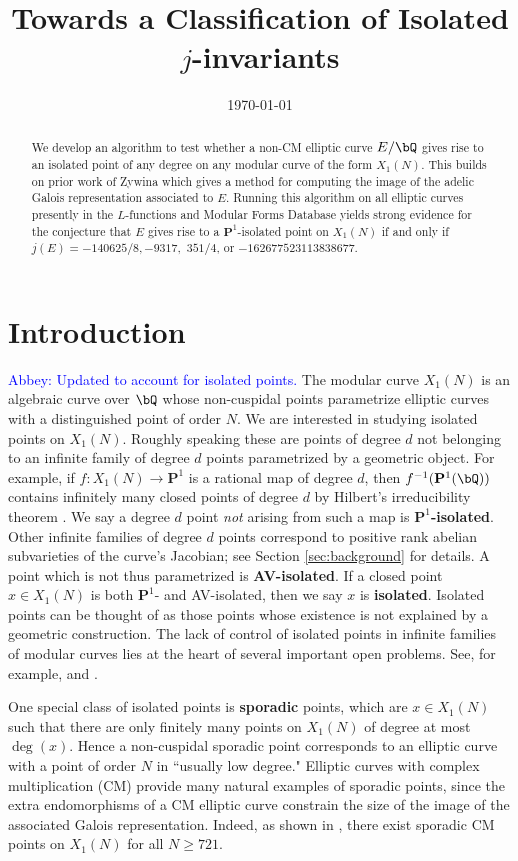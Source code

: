 \documentclass[11pt,reqno]{amsart}
\title{Towards a Classification of Isolated $j$-invariants}
\date{\today}
\theoremstyle{plain}
\theoremstyle{definition}
\newcommand{\Q}{\bQ}
\newcommand{\PP}{\mathbf P}
\newcommand{\abbey}[1]{\textcolor{blue}{Abbey: #1}}
\begin{document}
\begin{abstract} 
We develop an algorithm to test whether a non-CM elliptic curve $E/\Q$ gives rise to an isolated point of any degree on any modular curve of the form $X_1(N)$. This builds on prior work of Zywina which gives a method for computing the image of the adelic Galois representation associated to $E$. Running this algorithm on all elliptic curves presently in the $L$-functions and Modular Forms Database yields strong evidence for the conjecture that $E$ gives rise to a $\PP^1$-isolated point on $X_1(N)$ if and only if $j(E)=-140625/8, -9317,$ $351/4$, or $-162677523113838677$.
    \end{abstract}
\maketitle

\section{Introduction}
\label{sec:intro}
\abbey{Updated to account for isolated points.}
The modular curve $X_1(N)$ is an algebraic curve over $\Q$ whose non-cuspidal points parametrize elliptic curves with a distinguished point of order $N$. We are interested in studying isolated points on $X_1(N)$. Roughly speaking these are points of degree $d$ not belonging to an infinite family of degree $d$ points parametrized by a geometric object. For example, if $f: X_1(N) \rightarrow \PP^1$ is a rational map of degree $d$, then $f^{-1}(\PP^1(\Q))$ contains infinitely many closed points of degree $d$ by Hilbert's irreducibility theorem \cite[Chapter 9]{serre97}. We say a degree $d$ point \emph{not} arising from such a map is \textbf{$\PP^1$-isolated}. Other infinite families of degree $d$ points correspond to positive rank abelian subvarieties of the curve's Jacobian; see Section \ref{sec:background} for details. A point which is not thus parametrized is \textbf{AV-isolated}. If a closed point $x\in X_1(N)$ is both $\PP^1$- and AV-isolated, then we say $x$ is \textbf{isolated}. Isolated points can be thought of as those points whose existence is not explained by a geometric construction. The lack of control of isolated points in infinite families of modular curves lies at the heart of several important open problems. See, for example, \cite[Question 1]{MazurNote} and \cite[Theorem 1.3]{BourdonNajman2021}.

One special class of isolated points is \textbf{sporadic} points, which are $x \in X_1(N)$ such that there are only finitely many points on $X_1(N)$ of degree at most $\deg(x)$. Hence a non-cuspidal sporadic point corresponds to an elliptic curve with a point of order $N$ in ``usually low degree." Elliptic curves with complex multiplication (CM) provide many natural examples of sporadic points, since the extra endomorphisms of a CM elliptic curve constrain the size of the image of the associated Galois representation. Indeed, as shown in \cite[Theorem 8.2]{CGPS2022}, there exist sporadic CM points on $X_1(N)$ for all $N\geq 721$.
\end{document}
